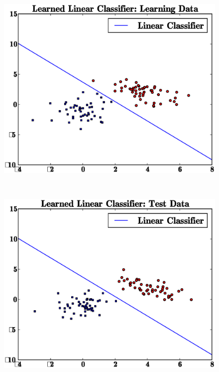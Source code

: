 \documentclass[letterpaper,10pt,titlepage]{article}
\begin{document}
\begin{figure}[th!]
\centering
\includegraphics[width=5in]{learn.eps} 
\end{figure} 
\\[5mm]
\begin{figure}[th!]
\centering
\includegraphics[width=5in]{test.eps} 
\end{figure} 
\\[5mm] 
\pagebreak
\end{document}
